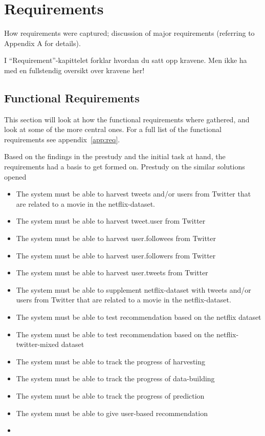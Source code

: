 
\chapter{Requirements}

\minitoc

How requirements  were  captured;
  discussion  of  major requirements
(referring  to  Appendix  A for details).

I “Requirement”-kapittelet forklar hvordan du satt opp kravene.
Men ikke ha med en fullstendig oversikt over kravene her!


\clearpage

\section{Functional Requirements}
This section will look at how the functional requirements where gathered, and look at some of the more central ones. For a full list of the functional requirements see appendix~\ref{app:req}.

Based on the findings in the prestudy and the initial task at hand, the requirements had a basis to get formed on. Prestudy on the similar solutions opened

\begin{itemize}
  \item The system must be able to harvest tweets and/or users from Twitter that are related to a movie in the netflix-dataset.
  \item The system must be able to harvest tweet.user from Twitter
  \item The system must be able to harvest user.followees from Twitter
  \item The system must be able to harvest user.followers from Twitter
  \item The system must be able to harvest user.tweets from Twitter

  \item The system must be able to supplement netflix-dataset with tweets and/or users from Twitter that are related to a movie in the netflix-dataset.
  \item The system must be able to test recommendation based on the netflix dataset
  \item The system must be able to test recommendation based on the netflix-twitter-mixed dataset
  \item The system must be able to track the progress of harvesting
  \item The system must be able to track the progress of data-building
  \item The system must be able to track the progress of prediction
  \item The system must be able to give user-based recommendation
  \item
\end{itemize}

